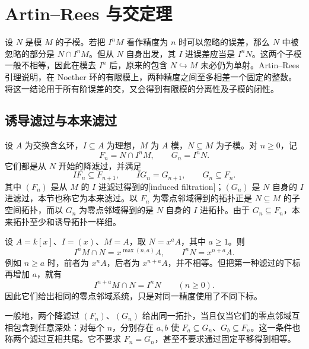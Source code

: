 
% 
% 

\section{Artin–Rees 与交定理}
\label{g5:sec:0702}

设 \(N\) 是模 \(M\) 的子模。若把 \(I^nM\) 看作精度为 \(n\) 时可以忽略的误差，那么 \(N\) 中被忽略的部分是 \(N\cap I^nM\)。但从 \(N\) 自身出发，其 \(I\) 进误差应当是 \(I^nN\)。这两个子模一般不相等，因此在模去 \(I^n\) 后，原来的包含 \(N\hookrightarrow M\) 未必仍为单射。Artin–Rees 引理说明，在 Noether 环的有限模上，两种精度之间至多相差一个固定的整数。将这一结论用于所有阶误差的交，又会得到有限模的分离性及子模的闭性。

\subsection{诱导滤过与本来滤过}
\label{g5:subsec:0702:01}

设 \(A\) 为交换含幺环，\(I\subseteq A\) 为理想，\(M\) 为 \(A\) 模，\(N\subseteq M\) 为子模。对 \(n\geq0\)，记
\[
	F_n=N\cap I^nM,\qquad G_n=I^nN.
\]
它们都是从 \(N\) 开始的降滤过，并满足
\[
	IF_n\subseteq F_{n+1},\qquad IG_n=G_{n+1},\qquad
	G_n\subseteq F_n.
\]
其中 \((F_n)\) 是从 \(M\) 的 \(I\) 进滤过得到的[induced filtration]；\((G_n)\) 是 \(N\) 自身的 \(I\) 进滤过，本节也称它为本来滤过。以 \(F_n\) 为零点邻域得到的拓扑正是 \(N\subseteq M\) 的子空间拓扑，而以 \(G_n\) 为零点邻域得到的是 \(N\) 自身的 \(I\) 进拓扑。由于 \(G_n\subseteq F_n\)，本来拓扑至少和诱导拓扑一样细。

\begin{example}\label{g5:exm:shifted-induced-filtration}
	设 \(A=k[x]\)、\(I=(x)\)、\(M=A\)，取 \(N=x^aA\)，其中 \(a\geq1\)。则
	\[
		I^nM\cap N=x^{\max(n,a)}A,
		\qquad I^nN=x^{n+a}A.
	\]
	例如 \(n\geq a\) 时，前者为 \(x^nA\)，后者为 \(x^{n+a}A\)，并不相等。但把第一种滤过的下标再增加 \(a\)，就有
	\[
		I^{n+a}M\cap N=I^nN\qquad(n\geq0).
	\]
	因此它们给出相同的零点邻域系统，只是对同一精度使用了不同下标。
\end{example}

一般地，两个降滤过 \((F_n)\)、\((G_n)\) 给出同一拓扑，当且仅当它们的零点邻域互相包含到任意深处：对每个 \(n\)，分别存在 \(a,b\) 使 \(F_a\subseteq G_n\)、\(G_b\subseteq F_n\)。这一条件也称两个滤过互相共尾。它不要求 \(F_n=G_n\)，甚至不要求通过固定平移得到相等。

